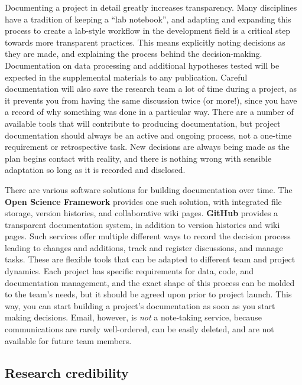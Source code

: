 Documenting a project in detail greatly increases transparency.
Many disciplines have a tradition of keeping a ``lab notebook'',
and adapting and expanding this process to create a
lab-style workflow in the development field is a
critical step towards more transparent practices.
This means explicitly noting decisions as they are made,
and explaining the process behind the decision-making.
Documentation on data processing and additional hypotheses tested
will be expected in the supplemental materials to any publication.
Careful documentation will also save the research team a lot of time during a project,
as it prevents you from having the same discussion twice (or more!),
since you have a record of why something was done in a particular way.
There are a number of available tools
that will contribute to producing documentation,
but project documentation should always be an active and ongoing process,
not a one-time requirement or retrospective task.
New decisions are always being made as the plan begins contact with reality,
and there is nothing wrong with sensible adaptation so long as it is recorded and disclosed.

There are various software solutions for building documentation over time.
The \textbf{Open Science Framework} provides one such solution,
with integrated file storage, version histories, and collaborative wiki pages.
\textbf{GitHub} provides a transparent documentation system,
in addition to version histories and wiki pages.
Such services offer multiple different ways
to record the decision process leading to changes and additions,
track and register discussions, and manage tasks.
These are flexible tools that can be adapted to different team and project dynamics.
Each project has specific requirements for data, code, and documentation management,
and the exact shape of this process can be molded to the team's needs,
but it should be agreed upon prior to project launch.
This way, you can start building a project's documentation as soon as you start making decisions.
Email, however, is \textit{not} a note-taking service, because communications are rarely well-ordered,
can be easily deleted, and are not available for future team members.

\subsection{Research credibility}

